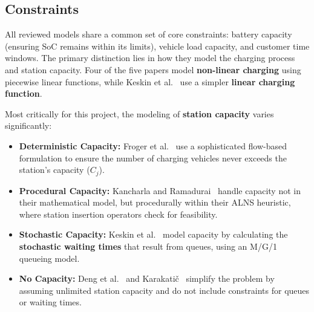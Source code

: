 \subsection{Constraints}
All reviewed models share a common set of core constraints: battery capacity (ensuring SoC remains within its limits), vehicle load capacity, and customer time windows. The primary distinction lies in how they model the charging process and station capacity. Four of the five papers model \textbf{non-linear charging} using piecewise linear functions, while Keskin et al.~\cite{Keskin2021} use a simpler \textbf{linear charging function}.

Most critically for this project, the modeling of \textbf{station capacity} varies significantly:
\begin{itemize}
    \item \textbf{Deterministic Capacity:} Froger et al.~\cite{Froger2022} use a sophisticated flow-based formulation to ensure the number of charging vehicles never exceeds the station's capacity ($C_j$).
    \item \textbf{Procedural Capacity:} Kancharla and Ramadurai~\cite{Kancharla2020} handle capacity not in their mathematical model, but procedurally within their ALNS heuristic, where station insertion operators check for feasibility.
    \item \textbf{Stochastic Capacity:} Keskin et al.~\cite{Keskin2021} model capacity by calculating the \textbf{stochastic waiting times} that result from queues, using an M/G/1 queueing model.
    \item \textbf{No Capacity:} Deng et al.~\cite{Deng2024} and Karakatič~\cite{Karakatic2021} simplify the problem by assuming unlimited station capacity and do not include constraints for queues or waiting times.
\end{itemize}



